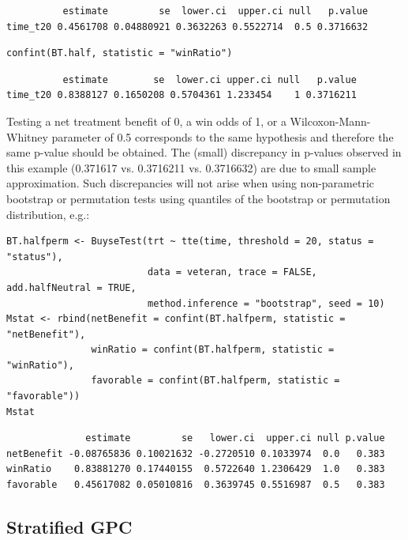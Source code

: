 \documentclass[12pt]{article}
\begin{document}
\begin{verbatim}
          estimate         se  lower.ci  upper.ci null   p.value
time_t20 0.4561708 0.04880921 0.3632263 0.5522714  0.5 0.3716632
\end{verbatim}


\lstset{language=r,label= ,caption= ,captionpos=b,numbers=none}
\begin{lstlisting}
confint(BT.half, statistic = "winRatio")
\end{lstlisting}

\begin{verbatim}
          estimate        se  lower.ci upper.ci null   p.value
time_t20 0.8388127 0.1650208 0.5704361 1.233454    1 0.3716211
\end{verbatim}


Testing a net treatment benefit of 0, a win odds of 1, or a
 Wilcoxon-Mann-Whitney parameter of 0.5 corresponds to the same
 hypothesis and therefore the same p-value should be obtained. The
 (small) discrepancy in p-values observed in this example (0.371617
 vs. 0.3716211 vs. 0.3716632) are due to small sample
 approximation. Such discrepancies will not arise when using
 non-parametric bootstrap or permutation tests using quantiles of the
 bootstrap or permutation distribution, e.g.:
\lstset{language=r,label= ,caption= ,captionpos=b,numbers=none}
\begin{lstlisting}
BT.halfperm <- BuyseTest(trt ~ tte(time, threshold = 20, status = "status"),
                         data = veteran, trace = FALSE, add.halfNeutral = TRUE,
                         method.inference = "bootstrap", seed = 10)
Mstat <- rbind(netBenefit = confint(BT.halfperm, statistic = "netBenefit"),
               winRatio = confint(BT.halfperm, statistic = "winRatio"),
               favorable = confint(BT.halfperm, statistic = "favorable"))
Mstat
\end{lstlisting}

\begin{verbatim}
              estimate         se   lower.ci  upper.ci null p.value
netBenefit -0.08765836 0.10021632 -0.2720510 0.1033974  0.0   0.383
winRatio    0.83881270 0.17440155  0.5722640 1.2306429  1.0   0.383
favorable   0.45617082 0.05010816  0.3639745 0.5516987  0.5   0.383
\end{verbatim}


\clearpage

\subsection{Stratified GPC}
\label{sec:orgdc6cb9f}
\end{document}
